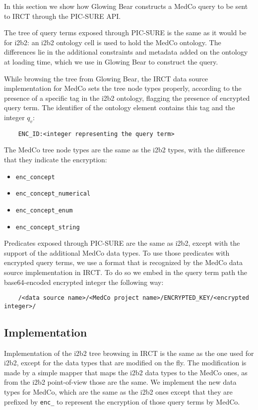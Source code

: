 In this section we show how Glowing Bear constructs a MedCo query to be sent to IRCT through the PIC-SURE API.

The tree of query terms exposed through PIC-SURE is the same as it would be for i2b2: an i2b2 ontology cell is used to hold the MedCo ontology. 
The differences lie in the additional constraints and metadata added on the ontology at loading time, which we use in Glowing Bear to construct the query.

While browsing the tree from Glowing Bear, the IRCT data source implementation for MedCo sets the tree node types properly, according to the presence of a specific tag in the i2b2 ontology, flagging the presence of encrypted query term.
The identifier of the ontology element contains this tag and the integer $q_v$:
\begin{verbatim}
    ENC_ID:<integer representing the query term>
\end{verbatim}

The MedCo tree node types are the same as the i2b2 types, with the difference that they indicate the encryption:
\begin{itemize}    
    \setlength\itemsep{0em}

    \item \verb|enc_concept|
    \item \verb|enc_concept_numerical|
    \item \verb|enc_concept_enum|
    \item \verb|enc_concept_string|
\end{itemize}

Predicates exposed through PIC-SURE are the same as i2b2, except with the support of the additional MedCo data types.
To use those predicates with encrypted query terms, we use a format that is recognized by the MedCo data source implementation in IRCT. 
To do so we embed in the query term path the base64-encoded encrypted integer the following way:
\begin{verbatim}
    /<data source name>/<MedCo project name>/ENCRYPTED_KEY/<encrypted integer>/
\end{verbatim}


\subsection{Implementation}

Implementation of the i2b2 tree browsing in IRCT is the same as the one used for i2b2, except for the data types that are modified on the fly.
The modification is made by a simple mapper that maps the i2b2 data types to the MedCo ones, as from the i2b2 point-of-view those are the same.
We implement the new data types for MedCo, which are the same as the i2b2 ones except that they are prefixed by \verb|enc_| to represent the encryption of those query terms by MedCo.

